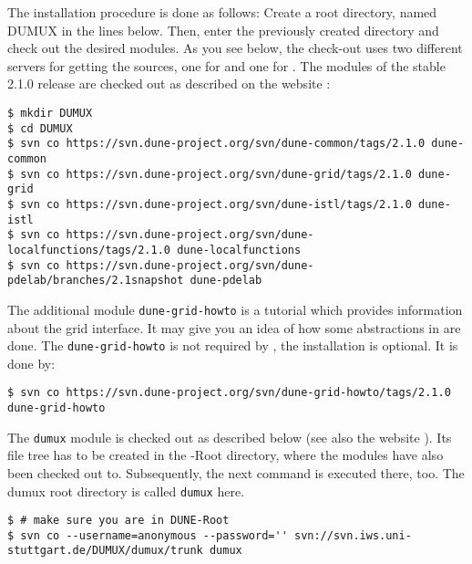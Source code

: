 The installation procedure is done as follows:
Create a  {\Dune} root directory, named DUMUX in the lines below.
Then, enter the previously created directory and check out the desired modules. 
As you see below, the check-out uses two different servers for getting the sources, one for \Dune and one for {\Dumux}.
The \Dune modules of the stable 2.1.0 release are checked out as described on the \Dune website \cite{DUNE-DOWNLOAD-SVN}:

\begin{lstlisting}[style=Bash]
$ mkdir DUMUX
$ cd DUMUX
$ svn co https://svn.dune-project.org/svn/dune-common/tags/2.1.0 dune-common
$ svn co https://svn.dune-project.org/svn/dune-grid/tags/2.1.0 dune-grid
$ svn co https://svn.dune-project.org/svn/dune-istl/tags/2.1.0 dune-istl
$ svn co https://svn.dune-project.org/svn/dune-localfunctions/tags/2.1.0 dune-localfunctions
$ svn co https://svn.dune-project.org/svn/dune-pdelab/branches/2.1snapshot dune-pdelab
\end{lstlisting}


The additional module \texttt{dune-grid-howto} is a tutorial which provides information about the \Dune grid interface.
It may give you an idea of how some abstractions in \Dune are done.
The \texttt{dune-grid-howto} is not required by \Dumux, the installation is optional. It is done by: 

\begin{lstlisting}[style=Bash]
$ svn co https://svn.dune-project.org/svn/dune-grid-howto/tags/2.1.0 dune-grid-howto
\end{lstlisting}

The \texttt{dumux} module is checked out as described below (see also the \Dumux website \cite{DUMUX-HP}).
Its file tree has to be created in the \Dune-Root directory, where the \Dune modules have also been checked out to. Subsequently, the next command
is executed there, too. The dumux root directory is called \texttt{dumux} here.

\begin{lstlisting}[style=Bash]
$ # make sure you are in DUNE-Root
$ svn co --username=anonymous --password='' svn://svn.iws.uni-stuttgart.de/DUMUX/dumux/trunk dumux
\end{lstlisting}

